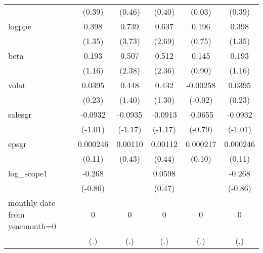 \begin{table}[htbp]
\begin{tabular}{l*{5}{c}}
                    &      (0.39)         &      (0.46)         &      (0.40)         &      (0.03)         &      (0.39)         \\
[1em]
logppe              &       0.398         &       0.739\sym{***}&       0.637\sym{**} &       0.196         &       0.398         \\
                    &      (1.35)         &      (3.73)         &      (2.69)         &      (0.75)         &      (1.35)         \\
[1em]
beta                &       0.193         &       0.507\sym{*}  &       0.512\sym{*}  &       0.145         &       0.193         \\
                    &      (1.16)         &      (2.38)         &      (2.36)         &      (0.90)         &      (1.16)         \\
[1em]
volat               &      0.0395         &       0.448         &       0.432         &    -0.00258         &      0.0395         \\
                    &      (0.23)         &      (1.40)         &      (1.30)         &     (-0.02)         &      (0.23)         \\
[1em]
salesgr             &     -0.0932         &     -0.0935         &     -0.0913         &     -0.0655         &     -0.0932         \\
                    &     (-1.01)         &     (-1.17)         &     (-1.17)         &     (-0.79)         &     (-1.01)         \\
[1em]
epsgr               &    0.000246         &     0.00110         &     0.00112         &    0.000217         &    0.000246         \\
                    &      (0.11)         &      (0.43)         &      (0.44)         &      (0.10)         &      (0.11)         \\
[1em]
log\_scope1          &      -0.268         &                     &      0.0598         &                     &      -0.268         \\
                    &     (-0.86)         &                     &      (0.47)         &                     &     (-0.86)         \\
[1em]
monthly date from yearmonth=0&           0         &           0         &           0         &           0         &           0         \\
                    &         (.)         &         (.)         &         (.)         &         (.)         &         (.)         \\

\end{tabular}
\end{table}
